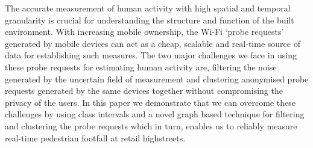 The accurate measurement of human activity with high spatial and temporal
granularity is crucial for understanding the structure and function of the built
environment.  With increasing mobile ownership, the Wi-Fi `probe requests'
generated by mobile devices can act as a cheap, scalable and real-time source of
data for establishing such measures.  The two major challenges we face in using
these probe requests for estimating human activity are, filtering the noise
generated by the uncertain field of measurement and clustering anonymised probe
requests generated by the same devices together without compromising the privacy
of the users.  In this paper we demonstrate that we can overcome these
challenges by using class intervals and a novel graph based technique for
filtering and clustering the probe requests which in turn, enables us to
reliably measure real-time pedestrian footfall at retail highstreets.
